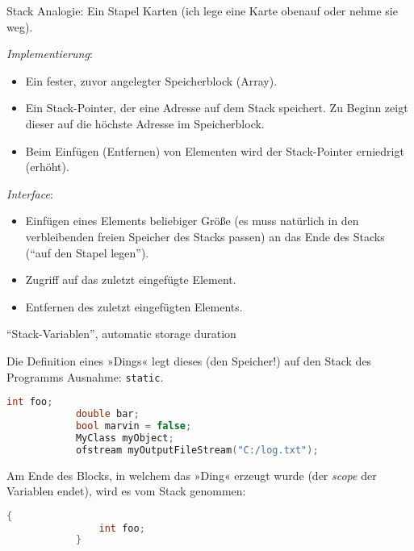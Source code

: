 \begin{frame}{Stack}
	Analogie: Ein Stapel Karten (ich lege eine Karte obenauf oder nehme sie weg).
	
	\hspace{1em}
	\pause
	
	\emph{Implementierung}:
	\begin{itemize}
		\item Ein fester, zuvor angelegter Speicherblock (Array).
		\item Ein Stack-Pointer, der eine Adresse auf dem Stack speichert. Zu Beginn zeigt dieser auf die höchste Adresse im Speicherblock.
		\item Beim Einfügen (Entfernen) von Elementen wird der Stack-Pointer erniedrigt (erhöht).
	\end{itemize}
	
	\pause
	
	\emph{Interface}:
	\begin{itemize}
		\item Einfügen eines Elements beliebiger Größe {\tiny(es muss natürlich in den verbleibenden freien Speicher des Stacks passen)} an das Ende des Stacks (\enquote{auf den Stapel legen}).
		\item Zugriff auf das zuletzt eingefügte Element.
		\item Entfernen des zuletzt eingefügten Elements.
	\end{itemize}
\end{frame}

\begin{frame}[fragile]{\enquote{Stack-Variablen}, automatic storage duration}
	\footnotesize

	Die Definition eines »Dings« legt dieses (den Speicher!) auf den Stack des Programms {\tiny Ausnahme: \verb|static|}.
	\begin{block}{}
		\begin{lstlisting}[language=C++]
			int foo;
			double bar;
			bool marvin = false;
			MyClass myObject;
			ofstream myOutputFileStream("C:/log.txt");
		\end{lstlisting}
	\end{block}
	
	\pause
	
	Am Ende des Blocks, in welchem das »Ding« erzeugt wurde (der \emph{scope} der Variablen endet), wird es vom Stack genommen:
	\begin{block}{}
		\begin{lstlisting}[language=C++]
			{
			    int foo;
			}
		\end{lstlisting}
	\end{block}
\end{frame}

